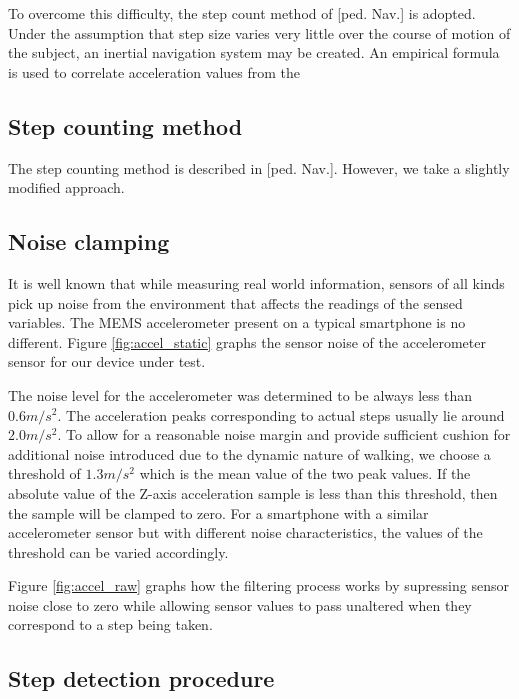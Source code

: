 To overcome this difficulty, the step count method of [ped. Nav.] is adopted. 
Under the assumption that step size varies very little over the course of 
motion of the subject, an inertial navigation system may be created. An
empirical formula is used to correlate acceleration values from 
the 

\subsection{Step counting method}

The step counting method is described in [ped. Nav.]. However, we take a
slightly modified approach. 


\subsection{Noise clamping\label{sec:NoiseClamping}}

It is well known that while measuring real world information, sensors of all 
kinds pick up noise from the environment that affects the readings of the 
sensed variables. The MEMS accelerometer present on a typical smartphone is 
no different. Figure \ref{fig:accel_static} graphs the sensor noise of 
the accelerometer sensor for our device under test.

The noise level for the accelerometer was determined to be always less
than $0.6 m/s^2$. The acceleration peaks corresponding to actual steps usually
lie around $2.0 m/s^2$. To allow for a reasonable noise margin and provide
sufficient cushion for additional noise introduced due to the dynamic nature of
walking, we choose a threshold of $1.3 m/s^2$ which is the mean value of the two
peak values. If the absolute value of the Z-axis acceleration sample is less
than this threshold, then the sample will be clamped to zero. For a smartphone
with a similar accelerometer sensor but with different noise characteristics,
the values of the threshold can be varied accordingly. 

Figure \ref{fig:accel_raw} graphs how the filtering process works by
supressing sensor noise close to zero while allowing sensor values to 
pass unaltered when they correspond to a step being taken.

\subsection{Step detection procedure}

